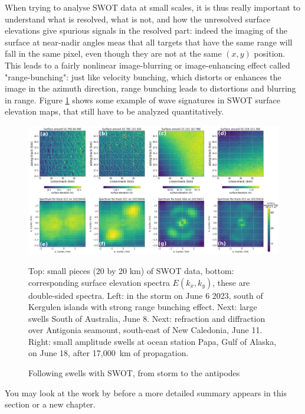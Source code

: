 When trying to analyse SWOT data at small scales, it is thus really important to understand what is resolved, what is not, and how the unresolved surface elevations give spurious signals in the resolved part: indeed the imaging of the surface at near-nadir angles meas that all targets that have the same range will fall in the same pixel, even though they are not at the same $(x,y)$ position. This leads to a fairly nonlinear image-blurring or image-enhancing effect called "range-bunching": just like velocity bunching, which distorts or enhances the image in the azimuth direction, range bunching leads to distortions and blurring in range. Figure \ref{fig:SWOTswell} shows some example of wave signatures in SWOT surface elevation maps, that still have to be analyzed quantitatively.
\begin{figure}[htb]
\centerline{\includegraphics[width=\textwidth]{FIGS_CH_SAT/SWOTSWELL.pdf}}
\caption{Following swells with SWOT, from storm to the antipodes}{Top: small pieces (20 by 20 km) of SWOT data, bottom: corresponding surface elevation spectra $E(k_x,k_y)$, these are double-sided spectra. Left: in the storm on June 6 2023, south of Kergulen islands with strong range bunching effect. Next: large swells South of Australia, June 8. Next: refraction and diffraction over Antigonia seamount, south-east of New Caledonia, June 11. Right: small amplitude swells at ocean station Papa, Gulf of Alaska, on June 18, after 17,000~km of propagation.}
\label{fig:SWOTswell}
\end{figure}
You may look at the work by \cite{Peral&al.2015} before a more detailed summary appears in this section or a new chapter. 


